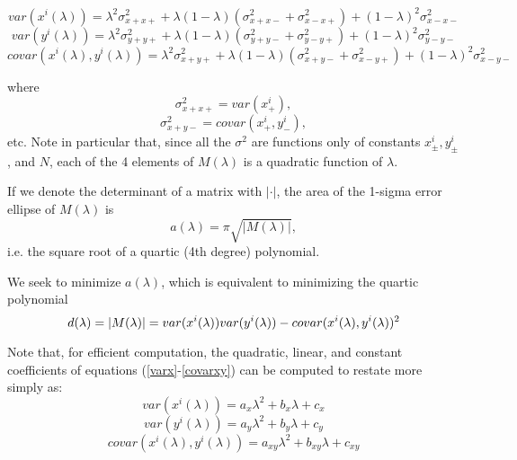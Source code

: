\documentclass[10pt]{amsart}
\begin{document}
\begin{equation}\label{varx}
var(x^i(\lambda)) = \lambda^2\sigma^2_{x+x+} + \lambda(1-\lambda)(\sigma^2_{x+x-} + \sigma^2_{x-x+}) 
                + (1-\lambda)^2\sigma^2_{x-x-}
\end{equation}
\begin{equation}\label{vary}
var(y^i(\lambda)) = \lambda^2\sigma^2_{y+y+} + \lambda(1-\lambda)(\sigma^2_{y+y-} + \sigma^2_{y-y+}) 
                + (1-\lambda)^2\sigma^2_{y-y-}\end{equation}
\begin{equation}\label{covarxy}
covar(x^i(\lambda),y^i(\lambda)) = \lambda^2\sigma^2_{x+y+}  
                        + \lambda(1-\lambda)(\sigma^2_{x+y-} + \sigma^2_{x-y+}) 
                              + (1-\lambda)^2\sigma^2_{x-y-}
\end{equation}

where
$$\sigma^2_{x+x+}=var(x^i_+),$$
$$\sigma^2_{x+y-}=covar(x^i_+, y^i_-),$$ 
etc. Note in particular that, since all the $\sigma^2$ are functions only of
constants $x^i_\pm, y^i_\pm$, and $N$, each of the 4 elements of $M(\lambda)$ is
a quadratic function of $\lambda$.

If we denote the determinant of a matrix with $|\cdot|$, the area of the
1-sigma error ellipse of $M(\lambda)$ is
$$a(\lambda) = \pi\sqrt{|M(\lambda)|},$$
i.e. the square root of a quartic (4th degree) polynomial.

We seek to minimize $a(\lambda)$, which is equivalent to minimizing
the quartic polynomial 
\begin{equation*}
d(\lambda) = |M(\lambda)| \\
           = var(x^i(\lambda))var(y^i(\lambda)) - covar(x^i(\lambda),y^i(\lambda))^2
\end{equation*}

Note that, for efficient computation, the quadratic, linear, and
constant coefficients of equations (\ref{varx}-\ref{covarxy}) can be
computed to restate more simply as:
\begin{equation}\label{qx}
var(x^i(\lambda)) = a_x\lambda^2 + b_x\lambda + c_x
\end{equation}
\begin{equation}\label{qy}
var(y^i(\lambda)) = a_y\lambda^2 + b_y\lambda + c_y
\end{equation}
\begin{equation}\label{qxy}
covar(x^i(\lambda),y^i(\lambda)) = a_{xy}\lambda^2 + b_{xy}\lambda + c_{xy}
\end{equation}
\end{document}
